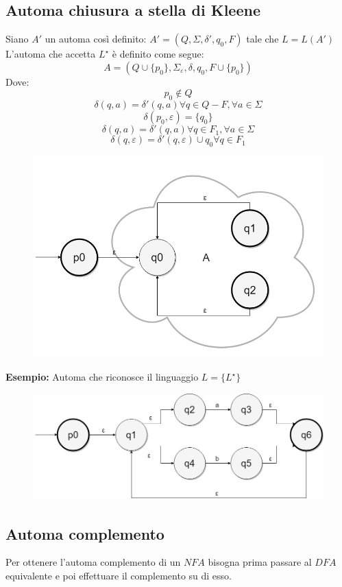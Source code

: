 \subsection{Automa chiusura a stella di Kleene}
Siano $A'$ un automa cos\`i definito:\newline
$A' = (Q, \Sigma, \delta', q_0,F)$ tale che $L = L(A')$ \newline
L'automa che accetta $L^{\star}$ \`e definito come segue:
\[
	A = (Q \cup \{p_0\}, \Sigma_{\varepsilon}, \delta, q_0, F \cup \{p_0\})
\]
Dove:
\[
	p_0 \notin Q
\]
\[
	\delta(q,a) = \delta'(q,a) \forall  q \in Q-F, \forall a \in \Sigma
\]
\[
	\delta(p_0,\varepsilon) =  \{q_0\}
\]
\[
	\delta(q,a) = \delta'(q,a) \forall  q \in F_1, \forall a \in \Sigma
\]
\[
	\delta(q,\varepsilon) = \delta'(q,\varepsilon) \cup {q_0} \forall  q \in F_1
\]
\begin{figure}[H]
	\includegraphics[scale=0.35]{l5_5}
\end{figure}
\textbf{Esempio:} Automa che riconosce il linguaggio $L = \{L^{\star}\}$
\begin{figure}[H]
	\includegraphics[scale=0.4]{l5_6}
\end{figure}

\subsection{Automa complemento}
Per ottenere l'automa complemento di un $NFA$ bisogna prima passare al $DFA$ equivalente e poi effettuare il complemento su di esso.


